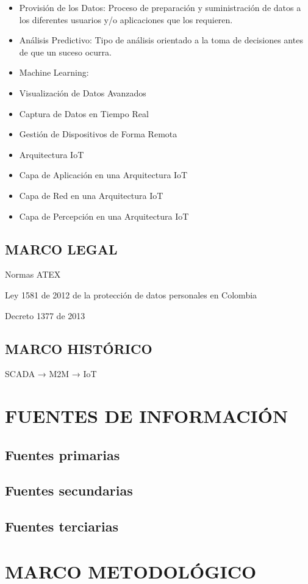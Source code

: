 \documentclass[stu,12pt,floatsintext]{apa7}
\begin{document}
\begin{itemize}
		\item Provisión de los Datos: Proceso de preparación y suministración de datos a los diferentes usuarios y/o aplicaciones que los requieren.
		\item Análisis Predictivo: Tipo de análisis orientado a la toma de decisiones antes de que un suceso ocurra.
		\item Machine Learning: 
		\item Visualización de Datos Avanzados
		\item Captura de Datos en Tiempo Real
		\item Gestión de Dispositivos de Forma Remota
		\item Arquitectura IoT
		\item Capa de Aplicación en una Arquitectura IoT
		\item Capa de Red en una Arquitectura IoT
		\item Capa de Percepción en una Arquitectura IoT
	\end{itemize}
	\subsection{MARCO LEGAL}
	Normas ATEX
	
	Ley 1581 de 2012 de la protección de datos personales en Colombia
	
	Decreto 1377 de 2013
	\subsection{MARCO HISTÓRICO}
	SCADA → M2M → IoT
	
	\section{FUENTES DE INFORMACIÓN}
	\subsection{Fuentes primarias}
	\subsection{Fuentes secundarias}
	\subsection{Fuentes terciarias}
	\section{MARCO METODOLÓGICO}
\end{document}

